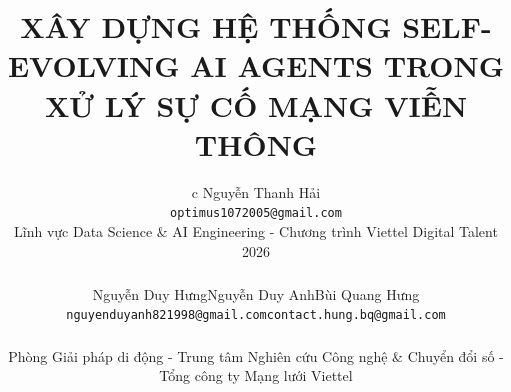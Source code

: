 \documentclass[10pt,twocolumn,letterpaper]{article}
\title{XÂY DỰNG HỆ THỐNG SELF-EVOLVING AI AGENTS TRONG XỬ LÝ SỰ CỐ MẠNG VIỄN THÔNG}
\author{
\begin{tabular}{c}
Nguyễn Thanh Hải\\
{\tt\small optimus1072005@gmail.com}\\
{\small Lĩnh vực Data Science \& AI Engineering - Chương trình Viettel Digital Talent 2026}\\[1.0em]
\begin{tabular}{>{\centering\arraybackslash}p{0.28\textwidth}@{\hspace{0.8em}}>{\centering\arraybackslash}p{0.28\textwidth}@{\hspace{0.8em}}>{\centering\arraybackslash}p{0.28\textwidth}}
Nguyễn Duy Hưng\textsuperscript{\textdagger} &
Nguyễn Duy Anh\textsuperscript{\textdagger} &
Bùi Quang Hưng\textsuperscript{\textdagger}\\
{\tt\small hungnd1235@gmail.com} &
{\tt\small nguyenduyanh821998@gmail.com} &
{\tt\small contact.hung.bq@gmail.com}
\end{tabular}\\[0.65em]
{\small \textsuperscript{\textdagger}Phòng Giải pháp di động - Trung tâm Nghiên cứu Công nghệ \& Chuyển đổi số - Tổng công ty Mạng lưới Viettel}
\end{tabular}
}
\begin{document}
\maketitle







{
    \small
    \renewcommand{\refname}{TÀI LIỆU THAM KHẢO}
    
    
}
\end{document}
